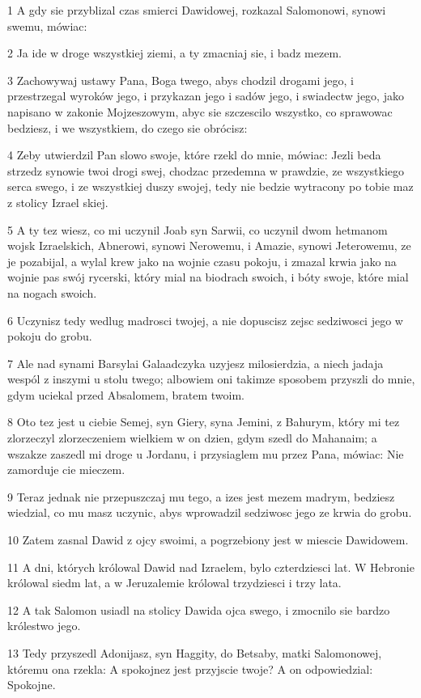 \par 1 A gdy sie przyblizal czas smierci Dawidowej, rozkazal Salomonowi, synowi swemu, mówiac:
\par 2 Ja ide w droge wszystkiej ziemi, a ty zmacniaj sie, i badz mezem.
\par 3 Zachowywaj ustawy Pana, Boga twego, abys chodzil drogami jego, i przestrzegal wyroków jego, i przykazan jego i sadów jego, i swiadectw jego, jako napisano w zakonie Mojzeszowym, abyc sie szczescilo wszystko, co sprawowac bedziesz, i we wszystkiem, do czego sie obrócisz:
\par 4 Zeby utwierdzil Pan slowo swoje, które rzekl do mnie, mówiac: Jezli beda strzedz synowie twoi drogi swej, chodzac przedemna w prawdzie, ze wszystkiego serca swego, i ze wszystkiej duszy swojej, tedy nie bedzie wytracony po tobie maz z stolicy Izrael skiej.
\par 5 A ty tez wiesz, co mi uczynil Joab syn Sarwii, co uczynil dwom hetmanom wojsk Izraelskich, Abnerowi, synowi Nerowemu, i Amazie, synowi Jeterowemu, ze je pozabijal, a wylal krew jako na wojnie czasu pokoju, i zmazal krwia jako na wojnie pas swój rycerski, który mial na biodrach swoich, i bóty swoje, które mial na nogach swoich.
\par 6 Uczynisz tedy wedlug madrosci twojej, a nie dopuscisz zejsc sedziwosci jego w pokoju do grobu.
\par 7 Ale nad synami Barsylai Galaadczyka uzyjesz milosierdzia, a niech jadaja wespól z inszymi u stolu twego; albowiem oni takimze sposobem przyszli do mnie, gdym uciekal przed Absalomem, bratem twoim.
\par 8 Oto tez jest u ciebie Semej, syn Giery, syna Jemini, z Bahurym, który mi tez zlorzeczyl zlorzeczeniem wielkiem w on dzien, gdym szedl do Mahanaim; a wszakze zaszedl mi droge u Jordanu, i przysiaglem mu przez Pana, mówiac: Nie zamorduje cie mieczem.
\par 9 Teraz jednak nie przepuszczaj mu tego, a izes jest mezem madrym, bedziesz wiedzial, co mu masz uczynic, abys wprowadzil sedziwosc jego ze krwia do grobu.
\par 10 Zatem zasnal Dawid z ojcy swoimi, a pogrzebiony jest w miescie Dawidowem.
\par 11 A dni, których królowal Dawid nad Izraelem, bylo czterdziesci lat. W Hebronie królowal siedm lat, a w Jeruzalemie królowal trzydziesci i trzy lata.
\par 12 A tak Salomon usiadl na stolicy Dawida ojca swego, i zmocnilo sie bardzo królestwo jego.
\par 13 Tedy przyszedl Adonijasz, syn Haggity, do Betsaby, matki Salomonowej, któremu ona rzekla: A spokojnez jest przyjscie twoje? A on odpowiedzial: Spokojne.
